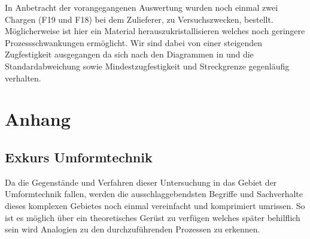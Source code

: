 \documentclass[12pt,a4paper,parskip]{scrartcl}
\begin{document}
{In Anbetracht der vorangegangenen Auswertung wurden noch einmal zwei Chargen (F19 und F18) bei dem Zulieferer, zu Versuchszwecken, bestellt. Möglicherweise ist hier ein Material herauszukristallisieren welches noch geringere Prozessschwankungen ermöglicht. Wir sind dabei von einer steigenden Zugfestigkeit ausgegangen da sich nach den Diagrammen in  und  die Standardabweichung sowie Mindestzugfestigkeit und Streckgrenze gegenläufig verhalten.


 











\newpage
\section{Anhang}
\subsection{Exkurs Umformtechnik}


Da die Gegenstände und Verfahren dieser Untersuchung in das Gebiet der Umformtechnik fallen, werden die ausschlaggebendsten Begriffe und Sachverhalte dieses komplexen Gebietes noch einmal vereinfacht und komprimiert umrissen. So ist es möglich über ein theoretisches Gerüst zu verfügen welches später behilflich sein wird   Analogien zu den durchzuführenden Prozessen zu erkennen.
}
\end{document}
